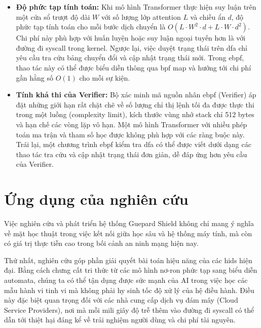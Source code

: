 \documentclass[../main.tex]{subfiles}
\begin{document}
\begin{itemize}
  \item \textbf{Độ phức tạp tính toán:} Khi mô hình Transformer thực hiện
    suy luận trên một cửa sổ trượt độ dài $W$ với số lượng lớp
    attention $L$ và chiều ẩn $d$, độ phức tạp tính toán cho mỗi bước
    dịch chuyển là $O(L \cdot W^2 \cdot d + L \cdot W \cdot d^2)$.
    Chi phí này phù hợp với huấn luyện hoặc suy luận ngoại tuyến hơn
    là với đường đi \gls{syscall} trong kernel. Ngược lại, việc duyệt trạng
    thái trên \gls{dfa} chỉ yêu cầu tra cứu bảng chuyển đổi và cập nhật
    trạng thái mới. Trong \gls{ebpf}, thao tác này có thể được biểu diễn
    thông qua \gls{bpf} map và hướng tới chi phí gần hằng số $O(1)$ cho mỗi
    sự kiện.
  \item \textbf{Tính khả thi của Verifier:} Bộ xác minh mã nguồn nhân \gls{ebpf}
    (Verifier) áp đặt những giới hạn rất chặt chẽ về số lượng chỉ thị
    lệnh tối đa được thực thi trong một luồng (complexity limit),
    kích thước vùng nhớ stack chỉ 512 bytes và hạn chế các vòng
    lặp vô hạn. Một mô hình Transformer với nhiều phép toán ma trận
    và tham số học được không phù hợp với các ràng buộc này. Trái
    lại, một chương trình \gls{ebpf} kiểm tra \gls{dfa} có thể được viết dưới dạng
    các thao tác tra cứu và cập nhật trạng thái đơn giản, dễ đáp ứng
    hơn yêu cầu của Verifier.
\end{itemize}

\enlargethispage{2\baselineskip}

\section{Ứng dụng của nghiên cứu}
\label{sec:tam-quan-trong}

Việc nghiên cứu và phát triển hệ thống Guepard Shield không chỉ mang ý
nghĩa về mặt học thuật trong việc kết nối giữa học sâu và hệ thống máy
tính, mà còn có giá trị thực tiễn cao trong bối cảnh an ninh mạng hiện
nay.

Thứ nhất, nghiên cứu góp phần giải quyết bài toán hiệu năng của các \gls{hids} hiện đại. Bằng cách chưng cất tri thức từ các mô hình nơ-ron
phức tạp sang biểu diễn automata, chúng ta có thể tận dụng được sức
mạnh của AI trong việc học các mẫu hành vi tinh vi mà không phải hy
sinh tốc độ xử lý của hệ điều hành. Điều này đặc biệt quan trọng đối
với các nhà cung cấp dịch vụ đám mây (Cloud Service Providers), nơi mà
mỗi mili giây độ trễ thêm vào đường đi \gls{syscall} có thể dẫn tới thiệt hại
đáng kể về trải nghiệm người dùng và chi phí tài nguyên.
\end{document}
